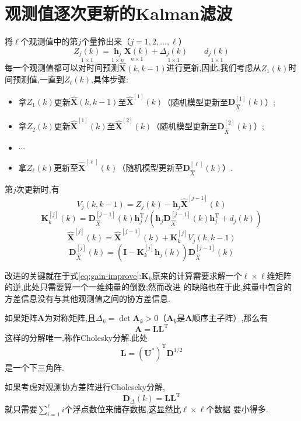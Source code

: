 \documentclass[cn,10pt,citestyle=gb7714-2015,bibstyle=gb7714-2015]{elegantbook}
\newcommand{\mT}{\mathrm{T}}
\renewcommand{\l}{\ell}
\begin{document}
\section{观测值逐次更新的Kalman滤波}\label{sec:kf-measurement-update}
将$\l$个观测值中的第$j$个量拎出来（$j=1,2,\ldots,\l$）
\[
  \underset{1\times 1}{Z_j(k)}=\underset{1\times n}{\bm{h}_j}\underset{n\times 1}{\bm{X}(k)}+\underset{1\times 1}{\varDelta_j(k)}\qquad \underset{1\times 1}{d_j(k)}
\]
每一个观测值都可以对时间预测$\hat{\bm{X}}(k,k-1)$进行更新,因此,我们考虑从$Z_1(k)$时间预测值,一直到$Z_\l(k)$,具体步骤:
\begin{itemize}
  \item 拿$Z_1(k)$更新$\hat{\bm{X}}(k,k-1)$至$\hat{\bm{X}}^{[1]}(k)$（随机模型更新至$\bm{D}^{[1]}_{\hat{X}}(k)$）;
  \item 拿$Z_2(k)$更新$\hat{\bm{X}}^{[1]}(k)$至$\hat{\bm{X}}^{[2]}(k)$（随机模型更新至$\bm{D}^{[2]}_{\hat{X}}(k)$）;
  \item $\cdots$
  \item 拿$Z_\l(k)$更新至$\hat{\bm{X}}^{[\l]}(k)$（随机模型更新至$\bm{D}^{[\l]}_{\hat{X}}(k)$）.
\end{itemize}
\begin{theorem}[观测值逐次更新一般公式]\label{thm:update-several-times}
  第$j$次更新时,有
  \begin{equation}
    V_j(k,k-1)=Z_j(k)-\bm{h}_j\hat{\bm{X}}^{[j-1]}(k)
  \end{equation}
  \begin{equation}\label{eq:gain-improve}
    \bm{K}_k^{[j]}(k)=\bm{D}_{\hat{X}}^{[j-1]}(k)\bm{h}_j^\mT\bigg/\left(\bm{h}_j\bm{D}_{\hat{X}}^{[j-1]}(k)\bm{h}_j^\mT+d_j(k)\right)
  \end{equation}
  \begin{equation}
    \hat{\bm{X}}^{[j]}(k)=\hat{\bm{X}}^{[j-1]}(k)+\bm{K}_k^{[j]}V_j(k,k-1)
  \end{equation}
  \begin{equation}
    \bm{D}_{\hat{X}}^{[j]}(k)=\left(\bm{I}-\bm{K}_k^{[j]}\bm{h}_j(k)\right)\bm{D}_{\hat{X}}^{[j-1]}(k)
  \end{equation}
\end{theorem}
改进的关键就在于式\eqref{eq:gain-improve}:$\bm{K}_k$原来的计算需要求解一个$\l\times\l$维矩阵的逆,此处只需要算一个一维纯量的倒数;然而改进
的缺陷也在于此,纯量中包含的方差信息没有与其他观测值之间的协方差信息.
\begin{theorem}[矩阵的Cholesky分解]\label{thm:matrix-cholesky}
  如果矩阵$\bm{A}$为对称矩阵,且$\varDelta_k=\det\bm{A}_k>0$（$\bm{A}_k$是$\bm{A}$顺序主子阵）,那么有
  \[
    \bm{A}=\bm{L}\bm{L}^\mT
  \]
  这样的分解唯一,称作Cholesky分解.此处
  \[
    \bm{L}=(\bm{U}^*)^\mT\bm{D}^{1/2}
  \]
  是一个下三角阵.
\end{theorem}
如果考虑对观测协方差阵进行Cholescky分解,
\begin{equation}\label{eq:cholesky-for-variance}
  \bm{D}_\varDelta(k)=\bm{L}\bm{L}^\mT  
\end{equation}
就只需要$\sum_{i=1}^\l i$个浮点数位来储存数据,这显然比$\l\times\l$个数据
要小得多.
\end{document}
